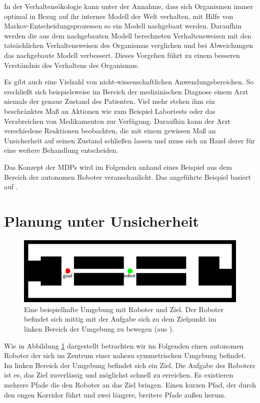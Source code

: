 \documentclass[a4paper]{IEEEtran}
\begin{document}
In der Verhaltensökologie kann unter der Annahme, dass sich Organismen immer optimal in Bezug auf ihr internes Modell der Welt verhalten, mit Hilfe von Markov-Entscheidungsprozessen so ein Modell nachgebaut werden. Daraufhin werden die aus dem nachgebauten Modell berechneten Verhaltensweisen mit den tatsächlichen Verhaltensweisen des Organismus verglichen und bei Abweichungen das nachgebaute Modell verbessert. Dieses Vorgehen führt zu einem besseren Verständnis des Verhaltens des Organismus.

Es gibt auch eine Vielzahl von nicht-wissenschaftlichen Anwendungsbereichen. So erschließt sich beispielsweise im Bereich der medizinischen Diagnose einem Arzt niemals der genaue Zustand des Patienten. Viel mehr stehen ihm ein beschränktes Maß an Aktionen wie zum Beispiel Labortests oder das Verabreichen von Medikamenten zur Verfügung. Daraufhin kann der Arzt verschiedene Reaktionen beobachten, die mit einem gewissen Maß an Unsicherheit auf seinen Zustand schließen lassen und muss sich an Hand derer für eine weitere Behandlung entscheiden. 

Das Konzept der MDPs wird im Folgenden anhand eines Beispiel aus dem Bereich der autonomen Roboter veranschaulicht. Das angeführte Beispiel basiert auf \cite{thrun2005probabilistic}.


\section{Planung unter Unsicherheit}
\label{sec:planning}
\begin{figure}[ht]
	\centering
	\includegraphics[scale=0.72]{images/autnmRobot_basicSituation.png}
	\caption{Eine beispielhafte Umgebung mit Roboter und Ziel. Der Roboter befindet sich mittig mit der Aufgabe sich zu dem Zielpunkt im linken Bereich der Umgebung zu bewegen (aus \cite{thrun2005probabilistic}).}
	\label{fig:autnmRob_bSit}
\end{figure}

Wie in Abbildung \ref{fig:autnmRob_bSit} dargestellt betrachten wir im Folgenden einen autonomen Roboter der sich im Zentrum einer nahezu symmetrischen Umgebung befindet. Im linken Bereich der Umgebung befindet sich ein Ziel. Die Aufgabe des Roboters ist es, das Ziel zuverlässig und möglichst schnell zu erreichen. Es existieren mehrere Pfade die den Roboter an das Ziel bringen. Einen kurzen Pfad, der durch den engen Korridor führt und zwei längere, breitere Pfade außen herum.
\end{document}
